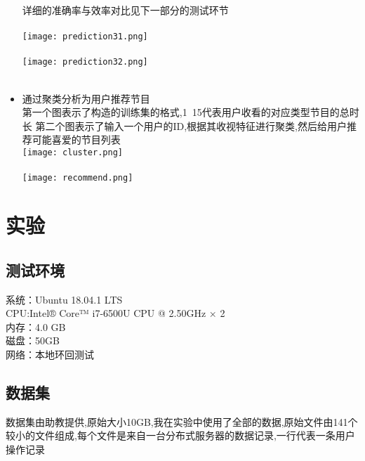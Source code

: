 \documentclass{hitreport}
\begin{document}
\begin{itemize}
        详细的准确率与效率对比见下一部分的测试环节\\
        ~\\
        \texttt{[image: prediction31.png]}\\
        ~\\
        \texttt{[image: prediction32.png]}\\
        ~\\
  \item 通过聚类分析为用户推荐节目\\
        第一个图表示了构造的训练集的格式,1~15代表用户收看的对应类型节目的总时长
        第二个图表示了输入一个用户的ID,根据其收视特征进行聚类,然后给用户推荐可能喜爱的节目列表
        ~\\
        \texttt{[image: cluster.png]}\\
        ~\\
        \texttt{[image: recommend.png]}\\
\end{itemize}
\section{实验}
\subsection{测试环境}
\begin{flushleft}
  系统：Ubuntu 18.04.1 LTS\\
  CPU:Intel® Core™ i7-6500U CPU @ 2.50GHz × 2 \\
  内存：4.0 GB\\
  磁盘：50GB\\
  网络：本地环回测试\\
\end{flushleft}
\subsection{数据集}
数据集由助教提供,原始大小10GB,我在实验中使用了全部的数据,原始文件由141个较小的文件组成,每个文件是来自一台分布式服务器的数据记录,一行代表一条用户操作记录
\end{document}

